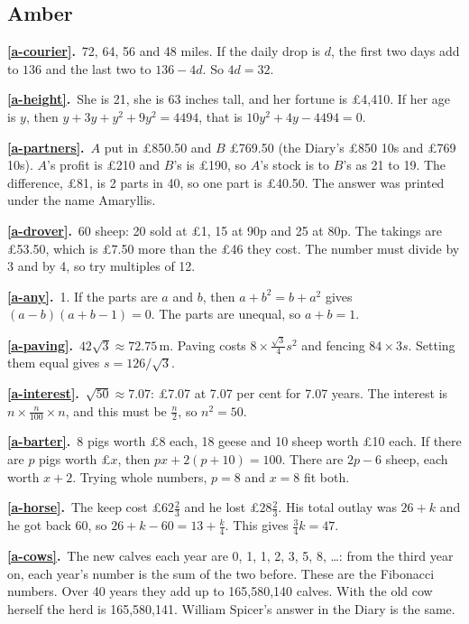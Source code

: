 \documentclass[11pt,a4paper]{article}
\newcommand{\ans}[2]{\par\smallskip\noindent\textbf{\ref{#1}.}\ #2}
\begin{document}
\subsection*{\color{bandamber}Amber}
\ans{a-courier}{72, 64, 56 and 48 miles. If the daily drop is $d$, the first two days
add to $136$ and the last two to $136 - 4d$. So $4d = 32$.}
\ans{a-height}{She is 21, she is 63 inches tall, and her fortune is \pounds4,410. If her age
is $y$, then $y + 3y + y^2 + 9y^2 = 4494$, that is $10y^2 + 4y - 4494 = 0$.}
\ans{a-partners}{$A$ put in \pounds850.50 and $B$ \pounds769.50 (the Diary's \pounds850 10s and
\pounds769 10s). $A$'s profit is \pounds210 and $B$'s is \pounds190, so $A$'s stock is to $B$'s as 21 to
19. The difference, \pounds81, is 2 parts in 40, so one part is \pounds40.50. The answer was
printed under the name Amaryllis.}
\ans{a-drover}{60 sheep: 20 sold at \pounds1, 15 at 90p and 25 at 80p. The takings are
\pounds53.50, which is \pounds7.50 more than the \pounds46 they cost. The number must divide by 3 and by
4, so try multiples of 12.}
\ans{a-any}{1. If the parts are $a$ and $b$, then $a + b^2 = b + a^2$ gives
$(a - b)(a + b - 1) = 0$. The parts are unequal, so $a + b = 1$.}
\ans{a-paving}{$42\sqrt3 \approx 72.75$\,m. Paving costs $8\times\tfrac{\sqrt3}{4}s^2$
and fencing $84\times3s$. Setting them equal gives $s = 126/\sqrt3$.}
\ans{a-interest}{$\sqrt{50}\approx7.07$: \pounds7.07 at 7.07 per cent for 7.07 years. The
interest is $n\times\tfrac{n}{100}\times n$, and this must be $\tfrac n2$, so $n^2 = 50$.}
\ans{a-barter}{8 pigs worth \pounds8 each, 18 geese and 10 sheep worth \pounds10 each. If there
are $p$ pigs worth \pounds$x$, then $px + 2(p + 10) = 100$. There are $2p - 6$ sheep, each worth
$x + 2$. Trying whole numbers, $p = 8$ and $x = 8$ fit both.}
\ans{a-horse}{The keep cost \pounds$62\tfrac23$ and he lost \pounds$28\tfrac23$. His total outlay
was $26 + k$ and he got back 60, so $26 + k - 60 = 13 + \tfrac k4$. This gives
$\tfrac34k = 47$.}
\ans{a-cows}{The new calves each year are 0, 1, 1, 2, 3, 5, 8, \dots: from the third
year on, each year's number is the sum of the two before. These are the Fibonacci
numbers. Over 40 years they add up to 165,580,140 calves. With the old cow herself the
herd is 165,580,141. William Spicer's answer in the Diary is the same.}
\end{document}
